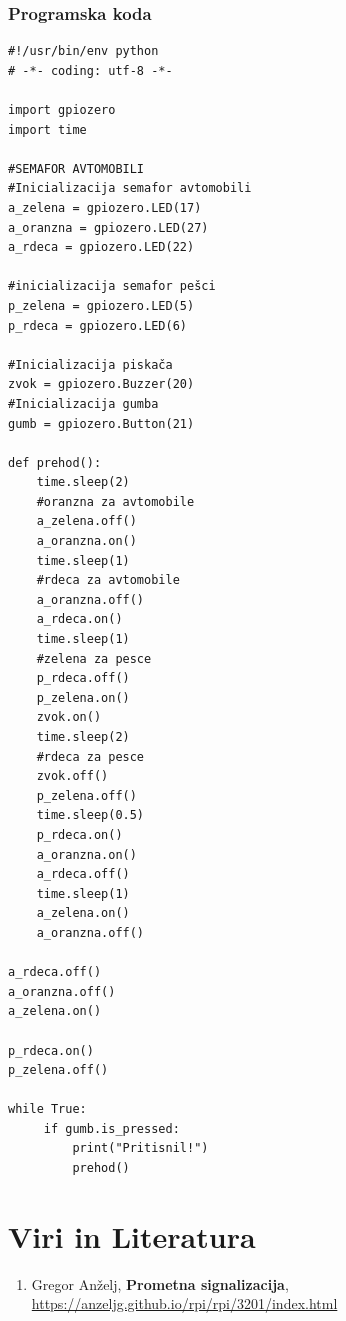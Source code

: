 \documentclass[11pt]{article}
\begin{document}
\subsubsection{Programska koda}
\label{sec:orga6a5831}
\begin{verbatim}
#!/usr/bin/env python
# -*- coding: utf-8 -*-

import gpiozero
import time

#SEMAFOR AVTOMOBILI
#Inicializacija semafor avtomobili
a_zelena = gpiozero.LED(17)
a_oranzna = gpiozero.LED(27)
a_rdeca = gpiozero.LED(22)

#inicializacija semafor pešci
p_zelena = gpiozero.LED(5)
p_rdeca = gpiozero.LED(6)

#Inicializacija piskača
zvok = gpiozero.Buzzer(20)
#Inicializacija gumba
gumb = gpiozero.Button(21)

def prehod():
    time.sleep(2)
    #oranzna za avtomobile
    a_zelena.off()
    a_oranzna.on()
    time.sleep(1)
    #rdeca za avtomobile
    a_oranzna.off()
    a_rdeca.on()
    time.sleep(1)
    #zelena za pesce
    p_rdeca.off()
    p_zelena.on()
    zvok.on()
    time.sleep(2)
    #rdeca za pesce
    zvok.off()
    p_zelena.off()
    time.sleep(0.5)
    p_rdeca.on()
    a_oranzna.on()
    a_rdeca.off()
    time.sleep(1)
    a_zelena.on()
    a_oranzna.off()

a_rdeca.off()
a_oranzna.off()
a_zelena.on()

p_rdeca.on()
p_zelena.off()

while True:
     if gumb.is_pressed:
         print("Pritisnil!")
         prehod()

\end{verbatim}

\section{Viri in Literatura}
\label{sec:orgbb2c851}
\begin{enumerate}
\item Gregor Anželj, \textbf{Prometna signalizacija}, 
\url{https://anzeljg.github.io/rpi/rpi/3201/index.html}
\end{enumerate}
\end{document}
